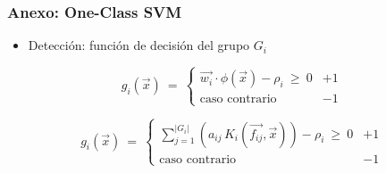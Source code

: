 \begin{frame}
    \frametitle{Anexo: One-Class SVM}

    \begin{itemize}
        \item
        \footnotesize Detección: función de decisión del grupo $G_{i}$
    \end{itemize}

    \begin{equation}
        g_{i}(\vec{x})
        \ = \
        \begin{cases}
            \vec{w_{i}} \cdot \phi(\vec{x}) - \rho_{i} \ \geqslant \ 0  & +1 \\
            \text{caso contrario}                                       & -1
        \end{cases}
    \end{equation}

    \begin{equation}
        g_{i}(\vec{x})
        \ = \
        \begin{cases}
            \sum_{j=1}^{\lvert G_{i} \rvert}
            \left(
                a_{ij} \, K_{i}(\vec{f_{ij}}, \vec{x})
            \right)
            - \rho_{i} \ \geqslant \ 0  & +1 \\
            \text{caso contrario}       & -1
        \end{cases}
    \end{equation}
\end{frame}

